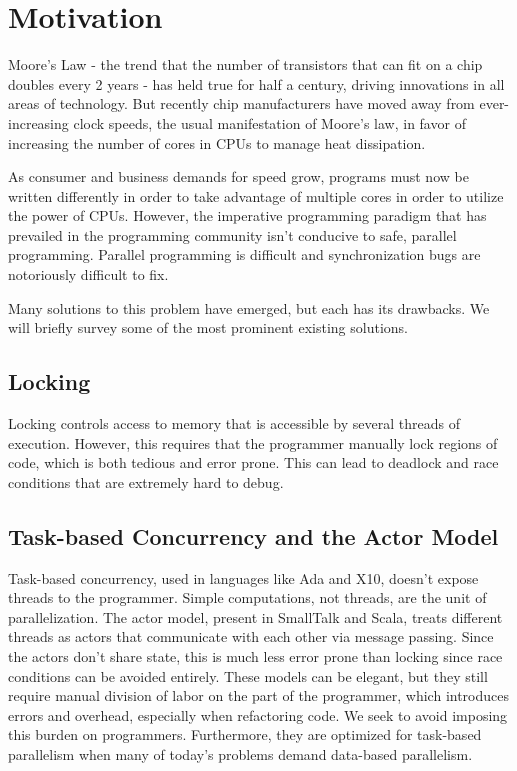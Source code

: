 \section{Motivation}
Moore's Law - the trend that the number of transistors that can fit on
a chip doubles every 2 years - has held true for half a century,
driving innovations in all areas of technology. But recently chip
manufacturers have moved away from ever-increasing clock speeds, the
usual manifestation of Moore's law, in favor of increasing the number of cores in CPUs to manage heat dissipation.

As consumer and business demands for speed grow, programs must now be
written differently in order to take advantage of multiple cores in order to utilize the
power of CPUs. However, the imperative programming paradigm that has prevailed in the programming community isn't conducive to safe,
parallel programming. Parallel programming is difficult and
synchronization bugs are notoriously difficult to fix.

Many solutions to this problem have emerged, but each has its drawbacks. We will
briefly survey some of the most prominent existing solutions.

\subsection{Locking}
Locking controls access to memory that is accessible by several threads of
execution. However, this requires that the programmer manually lock regions of code, which is both tedious and error prone. This can lead to deadlock and race conditions that are extremely
hard to debug.

\subsection{Task-based Concurrency and the Actor Model}
Task-based concurrency, used in languages like Ada and X10, doesn't
expose threads to the programmer. Simple computations, not threads, are
the unit of parallelization. The actor model, present in SmallTalk and
Scala, treats different threads as actors that communicate with each
other via message passing. Since the actors don't share state, this is
much less error prone than locking since race conditions can be
avoided entirely. These models can be elegant, but they still require
manual division of labor on the part of the programmer, which
introduces errors and overhead, especially when refactoring code. We
seek to avoid imposing this burden on programmers. Furthermore, they are
optimized for task-based parallelism when many of today's problems demand
data-based parallelism.

